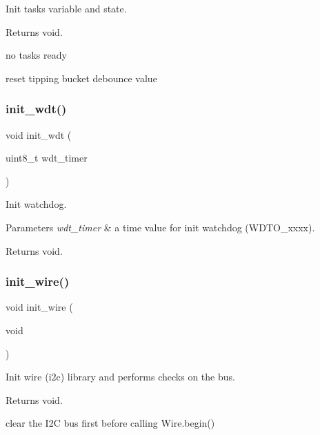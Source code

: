 Init tasks variable and state. 

\begin{DoxyReturn}{Returns}
void. 
\end{DoxyReturn}
no tasks ready

reset tipping bucket debounce value \mbox{\label{i2c-rain_8ino_a980e73df66b14b1190bc25da430a4f12}} 
\subsubsection{\texorpdfstring{init\+\_\+wdt()}{init\_wdt()}}
{\footnotesize\ttfamily void init\+\_\+wdt (\begin{DoxyParamCaption}\item[{uint8\+\_\+t}]{wdt\+\_\+timer }\end{DoxyParamCaption})}



Init watchdog. 


\begin{DoxyParams}{Parameters}
{\em wdt\+\_\+timer} & a time value for init watchdog (W\+D\+T\+O\+\_\+xxxx). \\
\hline
\end{DoxyParams}
\begin{DoxyReturn}{Returns}
void. 
\end{DoxyReturn}
\mbox{\label{i2c-rain_8ino_a2441543100bf8421f56edd622a2c1d9a}} 
\subsubsection{\texorpdfstring{init\+\_\+wire()}{init\_wire()}}
{\footnotesize\ttfamily void init\+\_\+wire (\begin{DoxyParamCaption}\item[{void}]{ }\end{DoxyParamCaption})}



Init wire (i2c) library and performs checks on the bus. 

\begin{DoxyReturn}{Returns}
void. 
\end{DoxyReturn}
clear the I2C bus first before calling Wire.\+begin()

